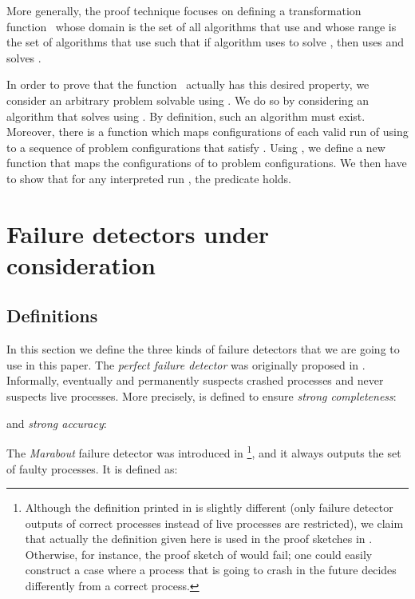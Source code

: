 \documentclass[11pt]{article}
\begin{document}
More generally, the proof technique focuses on defining a
     transformation function~ whose domain is the set of
     all algorithms that use  and whose range is the set of
     algorithms that use  such that if algorithm   uses
      to solve , then  uses 
     and solves .

In order to prove that the function~ actually has this
     desired property, we consider an arbitrary problem 
     solvable using .
We do so by considering an algorithm  that solves 
     using .
By definition, such an algorithm must exist.
Moreover, there is a function  which maps configurations of
     each valid run  of  using  to a sequence of problem
     configurations that satisfy .
Using , we define a new function  that maps
     the configurations of  to problem
     configurations.
We then have to show that for any interpreted run ,  the
     predicate  holds.



\section{Failure detectors under consideration}\label{sec:examples}


\subsection{Definitions}

In this section we define the three kinds of failure detectors that we
     are going to use in this paper.
The \emph{perfect failure detector}  was originally proposed in
     \cite{chan:ufdfr}.
Informally,  eventually and permanently suspects crashed
     processes and never suspects live processes.
More precisely,  is defined to ensure \emph{strong completeness}:   

and \emph{strong accuracy}:



The \emph{Marabout} failure detector  was introduced in
     \cite{guer:01:hfap}\footnote{Although the definition printed in
     \cite{guer:01:hfap} is slightly different (only failure detector
     outputs of correct processes instead of live processes are
     restricted), we claim that actually the definition given here is
     used in the proof sketches in \cite{guer:01:hfap}.
Otherwise, for instance, the proof sketch of
     \cite[Proposition~3.3]{guer:01:hfap} would fail; one could easily
     construct a case where a process that is going to crash in the
     future decides differently from a correct process.},
and it always outputs the set of faulty processes.
It is defined as:  
\end{document}
